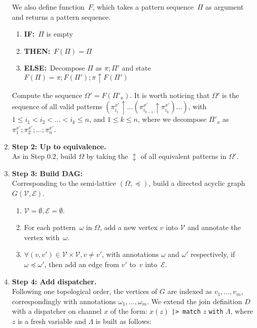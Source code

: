 \documentclass{LMCS}
\let \lst \lstinline
\newcommand{\pt}{\pi}
\newcommand{\ptbis}{\omega}
\newcommand{\ptsbis}{\Omega}
\newcommand{\pts}{\Pi}
\newcommand{\lubop}{\mathop{\uparrow}}
\newcommand{\lub}[2]{#1 \lubop #2}
\newcommand{\repr}[2]{#1 \mathop{\updownarrow} #2}
\renewcommand{\_}{\mathord{\rule[-.25ex]{1ex}{.15ex}}}
\newcommand{\V}{\mathcal{V}}
\newcommand{\E}{\mathcal{E}}
\begin{document}
\begin{enumerate}[\ ]
  We also define function~$F$, which takes a pattern sequence~$\pts$
  as argument and returns a pattern sequence.
  \begin{enumerate}[\ ]
  \item {\bf IF:}\ $\pts$ is empty
  \item {\bf THEN:}\ $F(\pts)=\pts$
  \item {\bf ELSE:}\ Decompose $\pts$ as $\pt;\pts'$ and state $F(\pts) =
    \pt; F(\pts'); \lub{\pt}{F(\pts')}$
  \end{enumerate}
  Compute the sequence $\ptsbis' = F(\pts'_x)$.  It is worth noticing
  that $\ptsbis'$ is the sequence of all valid patterns
  $(\pt^{x'}_{i_1}\lubop\ldots
  (\lub{\pt^{x'}_{i_{k-1}}}{\pt^{x'}_{i_k}}) \ldots)$, with $1 \leq
  i_1 < i_2 < \ldots < i_k \leq n$, and $1 \leq k \leq n$, where we
  decompose $\pts'_x$ as $\pt^{x'}_1 ; \pt^{x'}_2 ; \ldots ;
  \pt^{x'}_{n}$.
\item {\bf Step 2: Up to equivalence.}\ \hspace*{1cm} \\
  As in Step $0.2$, build $\ptsbis$ by taking the $\repr{}{}$ of all
  equivalent patterns in $\ptsbis'$.
\item {\bf Step 3: Build DAG:} \hspace*{1cm} \\
  Corresponding to the semi-lattice $(\ptsbis, \preceq)$, build a
  directed acyclic graph $G(\V,\E)$.
  \begin{enumerate}[(1)]
  \item $\V=\emptyset, \E=\emptyset$.
  \item For each pattern~$\ptbis$ in $\ptsbis$, add a new vertex $v$
    into $\V$ and annotate the vertex with~$\ptbis$.
  \item $\forall (v, v') \in \V \times \V, v \ne v'$, with annotations
    $\ptbis$ and $\ptbis'$ respectively, if $\ptbis \preceq \ptbis'$,
    then add an edge from $v'$ to~$v$ into~$\E$.
  \end{enumerate}
\item {\bf Step 4: Add dispatcher.} \hspace*{1cm} \\
  Following one topological order, the vertices of $G$ are indexed as
  $v_1, \ldots, v_m$, correspondingly with annotations $\ptbis_1,
  \ldots, \ptbis_m$. We extend the join definition $D$ with a
  dispatcher on channel $x$ of the form: $x(z)$ \lst"|> match" $z$
  \lst"with" $\Lambda$, where $z$ is a fresh variable and $\Lambda$ is
  built as follows:
  \begin{enumerate}[(1)]

\end{enumerate}
\end{enumerate}
\end{document}
